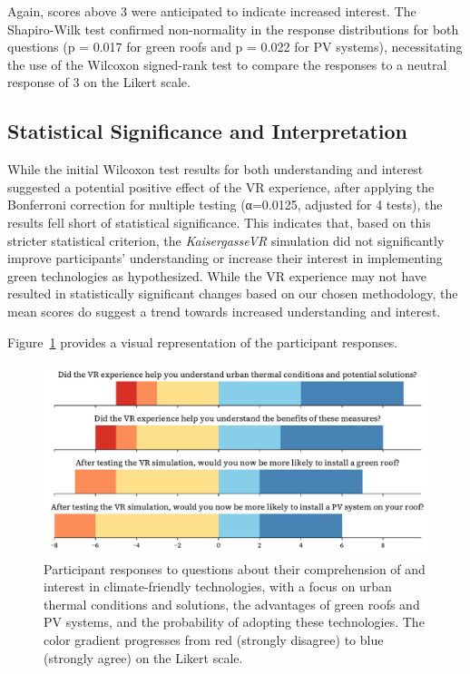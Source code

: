 \documentclass[draft, final]{vutinfth} %
\begin{document}
Again, scores above 3 were anticipated to indicate increased interest. The Shapiro-Wilk test confirmed non-normality in the response distributions for both questions (p = 0.017 for green roofs and p = 0.022 for PV systems), necessitating the use of the Wilcoxon signed-rank test to compare the responses to a neutral response of 3 on the Likert scale.

\subsection{Statistical Significance and Interpretation}

While the initial Wilcoxon test results for both understanding and interest suggested a potential positive effect of the VR experience, after applying the Bonferroni correction for multiple testing (α=0.0125, adjusted for 4 tests), the results fell short of statistical significance. This indicates that, based on this stricter statistical criterion, the \textit{KaisergasseVR} simulation did not significantly improve participants' understanding or increase their interest in implementing green technologies as hypothesized. While the VR experience may not have resulted in statistically significant changes based on our chosen methodology, the mean scores do suggest a trend towards increased understanding and interest.

Figure~\ref{fig:research-1} provides a visual representation of the participant responses.

\begin{figure}[h]
    \centering
    \includegraphics[width=\textwidth]{graphics/research-1.pdf}
    \caption{Participant responses to questions about their comprehension of and interest in climate-friendly technologies, with a focus on urban thermal conditions and solutions, the advantages of green roofs and PV systems, and the probability of adopting these technologies. The color gradient progresses from red (strongly disagree) to blue (strongly agree) on the Likert scale.}
    \label{fig:research-1}
\end{figure}
\end{document}
